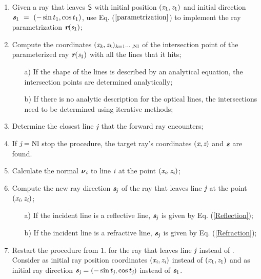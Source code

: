 \begin{enumerate}
 \item Given a ray that leaves $\textsf{S}$ with initial position $(\textit{x}_1, \textit{z}_1)$ and initial direction $\textit{\textbf{s}}_1~=~(-\sin t_1, \cos t_1)$, use Eq. ($\ref{parametrization}$) to implement the ray parametrization $\textit{\textbf{r}}(\textit{s}_1)$;
\item Compute the coordinates $(\textit{x}_{\textit{k}}, \textit{z}_{\textit{k}})_{\textit{k} = 1\cdots, \textrm{Nl}}$ of the intersection point of the parameterized ray $\textit{\textbf{r}}(\textit{s}_1)$ with all the lines that it hits;
\begin{itemize}
\item[a)] If the shape of the lines is described by an analytical equation, the intersection points are determined analytically;
\item[b)] If there is no analytic description for the optical lines, the intersections need to be determined using iterative methods;
\end{itemize}
\item  Determine the closest line $\textit{j}$ that the forward ray encounters;
\item If $\textit{j} = \textrm{Nl}$ stop the procedure, the target ray's coordinates $(\textit{x}, \textit{z})$ and $\textit{\textbf{s}}$ are found.
\item Calculate the normal $\boldsymbol{\nu}_{\textit{i}}$ to line $\textit{i}$ at the point $(\textit{x}_{\textit{i}}, \textit{z}_{\textit{i}})$;
 \item Compute the new ray direction $\textit{\textbf{s}}_{\textit{j}}$ of the ray that leaves line $\textit{j}$ at the point $(\textit{x}_{\textit{i}}, \textit{z}_{\textit{i}})$;
\begin{itemize}
\item[a)] If the incident line is a reflective line, $\textit{\textbf{s}}_{\textit{j}}$ is given by Eq. (\ref{Reflection});
\item[b)] If the incident line is a refractive line, $\textit{\textbf{s}}_{\textit{j}}$ is given by Eq. (\ref{Refraction});
\end{itemize}
\item Restart the procedure from $1.$ for the ray that leaves line $\textit{j}$ instead of . Consider as initial ray position coordinates $(\textit{x}_{\textit{i}}, \textit{z}_{\textit{i}})$ instead of $(\textit{x}_1, \textit{z}_1)$ and as initial ray direction $\textit{\textbf{s}}_{\textit{j}}= (-\sin t_{\textit{j}}, \cos t_{\textit{j}})$ instead of $\textit{\textbf{s}}_1$.
\end{enumerate}
